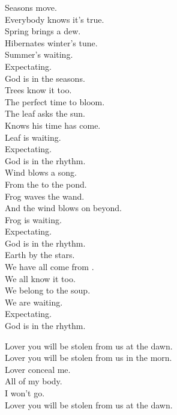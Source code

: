 Seasons move. \\
Everybody knows it's true. \\
Spring brings a dew. \\
Hibernates winter's tune. \\

Summer's waiting. \\
Expectating. \\
God is in the seasons. \\

Trees know it too. \\
The perfect time to bloom. \\
The leaf asks the sun. \\
Knows his time has come. \\

Leaf is waiting. \\
Expectating. \\
God is in the rhythm. \\

Wind blows a song. \\
From the  to the pond. \\
Frog waves the wand. \\
And the wind blows on beyond. \\

Frog is waiting. \\
Expectating. \\
God is in the rhythm. \\

Earth by the stars. \\
We have all come from . \\
We all know it too. \\
We belong to the soup. \\

We are waiting. \\
Expectating. \\
God is in the rhythm. \\




Lover you will be stolen from us at the dawn. \\
Lover you will be stolen from us in the morn. \\
Lover conceal me. \\
All of my body. \\
I won't go. \\
Lover you will be stolen from us at the dawn. \\

